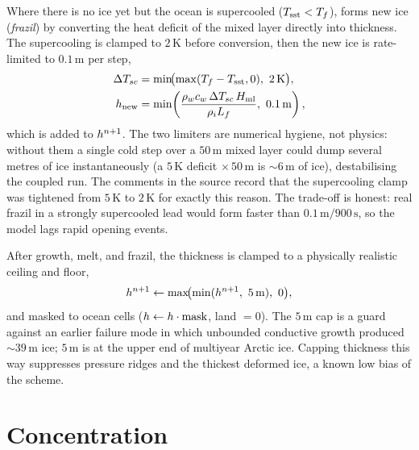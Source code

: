 Where there is no ice yet but the ocean is supercooled
($T_{\mathrm{sst}}<T_{f}$), \model{} forms new ice (\emph{frazil}) by converting
the heat deficit of the mixed layer directly into thickness. The supercooling is
clamped to $2\,\mathrm{K}$ before conversion, then the new ice is rate-limited to
$0.1\,\mathrm{m}$ per step,
\begin{align}
  \Delta T_{sc} &= \min\!\bigl(\max(\Tfr - T_{\mathrm{sst}},0),\ 2\,\mathrm{K}\bigr),\\
  \hice_{\mathrm{new}} &= \min\!\left(
        \frac{\rho_w c_w\,\Delta T_{sc}\,H_{\mathrm{ml}}}{\rhoice \Lf},\
        0.1\,\mathrm{m}\right),
  \label{eq:frazil}
\end{align}
which is added to $h^{n+1}$. The two limiters are numerical hygiene, not
physics: without them a single cold step over a $50\,\mathrm{m}$ mixed layer
could dump several metres of ice instantaneously (a $5\,\mathrm{K}$ deficit
$\times\,50\,\mathrm{m}$ is $\sim 6\,\mathrm{m}$ of ice), destabilising the
coupled run. The comments in the source record that the supercooling clamp was
tightened from $5\,\mathrm{K}$ to $2\,\mathrm{K}$ for exactly this reason. The
trade-off is honest: real frazil in a strongly supercooled lead would form
faster than $0.1\,\mathrm{m}/900\,\mathrm{s}$, so the model lags rapid opening
events.

After growth, melt, and frazil, the thickness is clamped to a physically
realistic ceiling and floor,
\begin{equation}
  h^{n+1} \leftarrow \max\!\bigl(\min(h^{n+1},\ 5\,\mathrm{m}),\ 0\bigr),
  \label{eq:hclamp}
\end{equation}
and masked to ocean cells ($h \leftarrow h\cdot\text{mask}$, land $=0$).
The $5\,\mathrm{m}$ cap is a guard against an earlier failure mode in which
unbounded conductive growth produced $\sim 39\,\mathrm{m}$ ice; $5\,\mathrm{m}$
is at the upper end of multiyear Arctic ice. Capping thickness this way
suppresses pressure ridges and the thickest deformed ice, a known low bias of
the scheme.

\section{Concentration}

